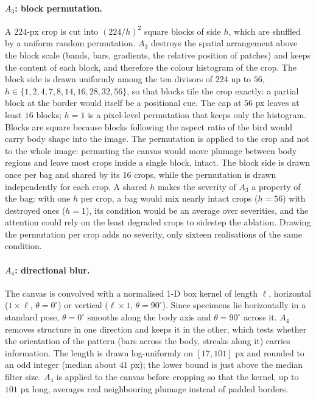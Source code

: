 \paragraph{$A_3$: block permutation.}
A $224$-px crop is cut into $(224/h)^2$ square blocks of side $h$, which are
shuffled by a uniform random permutation. $A_3$ destroys the spatial
arrangement above the block scale (bands, bars, gradients, the relative
position of patches) and keeps the content of each block, and therefore the
colour histogram of the crop. The block side is drawn uniformly among the ten
divisors of $224$ up to $56$, $h \in \{1, 2, 4, 7, 8, 14, 16, 28, 32, 56\}$, so
that blocks tile the crop exactly: a partial block at the border would itself
be a positional cue. The cap at $56$ px leaves at least $16$ blocks; $h = 1$ is a
pixel-level permutation that keeps only the histogram. Blocks are square
because blocks following the aspect ratio of the bird would carry body shape
into the image. The permutation is applied to the crop and not to the whole
image: permuting the canvas would move plumage between body regions and leave
most crops inside a single block, intact.
The block side is drawn once per bag and shared by its 16 crops, while the
permutation is drawn independently for each crop. A shared $h$ makes the
severity of $A_3$ a property of the bag: with one $h$ per crop, a bag would mix
nearly intact crops ($h = 56$) with destroyed ones ($h = 1$), its condition
would be an average over severities, and the attention could rely on the least
degraded crops to sidestep the ablation. Drawing the permutation per crop adds
no severity, only sixteen realisations of the same condition.

\paragraph{$A_4$: directional blur.}
The canvas is convolved with a normalised 1-D box kernel of length $\ell$,
horizontal ($1 \times \ell$, $\theta = 0^\circ$) or vertical ($\ell \times 1$,
$\theta = 90^\circ$). Since specimens lie horizontally in a standard pose,
$\theta = 0^\circ$ smooths along the body axis and $\theta = 90^\circ$ across
it. $A_4$ removes structure in one direction and keeps it in the other, which
tests whether the orientation of the pattern (bars across the body, streaks
along it) carries information. The length is drawn log-uniformly on
$[17, 101]$ px and rounded to an odd integer (median about $41$ px); the lower
bound is just above the median filter size. $A_4$ is applied to the canvas
before cropping so that the kernel, up to $101$ px long, averages real
neighbouring plumage instead of padded borders.

